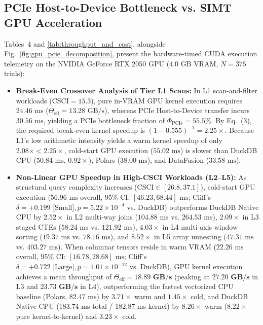 \documentclass[10pt,a4paper]{article}
\begin{document}
\subsection{PCIe Host-to-Device Bottleneck vs. SIMT GPU Acceleration}
Tables~4 and \ref{tab:throughput_and_cost}, alongside Fig.~\ref{fig:gpu_pcie_decomposition}, present the hardware-timed CUDA execution telemetry on the NVIDIA GeForce RTX 2050 GPU ($4.0\text{ GB}$ VRAM, $N=375$ trials):
\begin{itemize}[leftmargin=1.5em,itemsep=2pt]
    \item \textbf{Break-Even Crossover Analysis of Tier L1 Scans:} In L1 scan-and-filter workloads ($\text{CSCI}=15.3$), pure in-VRAM GPU kernel execution requires $24.46\text{ ms}$ ($\Theta_{\text{eff}} = 13.28\text{ GB/s}$), whereas PCIe Host-to-Device transfer incurs $30.56\text{ ms}$, yielding a PCIe bottleneck fraction of $\Phi_{\text{PCIe}} = 55.5\%$. By Eq.~(3), the required break-even kernel speedup is $(1 - 0.555)^{-1} = \mathbf{2.25\times}$. Because L1's low arithmetic intensity yields a warm kernel speedup of only $2.08\times < 2.25\times$, cold-start GPU execution ($55.02\text{ ms}$) is slower than DuckDB CPU ($50.84\text{ ms}$, $0.92\times$), Polars ($38.00\text{ ms}$), and DataFusion ($33.58\text{ ms}$).
    \item \textbf{Non-Linear GPU Speedup in High-CSCI Workloads (L2--L5):} As structural query complexity increases ($\text{CSCI} \in [26.8, 37.1]$), cold-start GPU execution ($56.96\text{ ms}$ overall, 95\% CI: $[46.23, 68.44]\text{ ms}$; Cliff's $\delta = +0.199\text{ [Small]}, p = 5.22 \times 10^{-4}$ vs. DuckDB) outperforms DuckDB Native CPU by $\mathbf{2.52\times}$ in L2 multi-way joins ($104.88\text{ ms}$ vs. $264.53\text{ ms}$), $\mathbf{2.09\times}$ in L3 staged CTEs ($58.24\text{ ms}$ vs. $121.92\text{ ms}$), $\mathbf{4.03\times}$ in L4 multi-axis window sorting ($19.37\text{ ms}$ vs. $78.16\text{ ms}$), and $\mathbf{8.52\times}$ in L5 array unnesting ($47.31\text{ ms}$ vs. $403.27\text{ ms}$). When columnar tensors reside in warm VRAM ($22.26\text{ ms}$ overall, 95\% CI: $[16.78, 28.68]\text{ ms}$; Cliff's $\delta = +0.722\text{ [Large]}, p = 1.01 \times 10^{-12}$ vs. DuckDB), GPU kernel execution achieves a mean throughput of $\Theta_{\text{eff}} = \mathbf{18.89\text{ GB/s}}$ (peaking at $\mathbf{27.20\text{ GB/s}}$ in L3 and $\mathbf{23.73\text{ GB/s}}$ in L4), outperforming the fastest vectorized CPU baseline (Polars, 82.47 ms) by $3.71\times$ warm and $1.45\times$ cold, and DuckDB Native CPU (183.74 ms total / 182.87 ms kernel) by $8.26\times$ warm ($8.22\times$ pure kernel-to-kernel) and $3.23\times$ cold.
\end{itemize}
\end{document}
